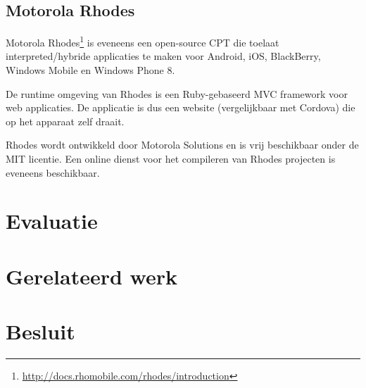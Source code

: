 \documentclass[a4paper]{IEEEconf}
\begin{document}
\subsection{Motorola Rhodes}

Motorola Rhodes\footnote{\url{http://docs.rhomobile.com/rhodes/introduction}} is eveneens een open-source CPT die toelaat interpreted/hybride applicaties te maken voor Android, iOS, BlackBerry, Windows Mobile en Windows Phone 8. 

De runtime omgeving van Rhodes is een Ruby-gebaseerd MVC framework voor web applicaties. De applicatie is dus een website (vergelijkbaar met Cordova) die op het apparaat zelf draait. 

Rhodes wordt ontwikkeld door Motorola Solutions en is vrij beschikbaar onder de MIT licentie. Een online dienst voor het compileren van Rhodes projecten is eveneens beschikbaar.

\section{Evaluatie}


\section{Gerelateerd werk}

\section{Besluit}

\printbibliography
\end{document}
